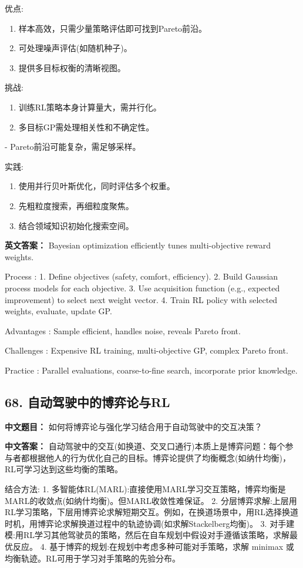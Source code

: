 \documentclass[10pt,a4paper]{ctexart}
\begin{document}
 优点:
\begin{enumerate}
    \item 样本高效，只需少量策略评估即可找到Pareto前沿。
    \item 可处理噪声评估(如随机种子)。
    \item 提供多目标权衡的清晰视图。
\end{enumerate}

 挑战:
\begin{enumerate}
    \item 训练RL策略本身计算量大，需并行化。
    \item 多目标GP需处理相关性和不确定性。
\end{enumerate}
- Pareto前沿可能复杂，需足够采样。

 实践:
\begin{enumerate}
    \item 使用并行贝叶斯优化，同时评估多个权重。
    \item 先粗粒度搜索，再细粒度聚焦。
    \item 结合领域知识初始化搜索空间。
\end{enumerate}

\textbf{英文答案：}  
Bayesian optimization efficiently tunes multi-objective reward weights.

 Process :
1. Define objectives (safety, comfort, efficiency).
2. Build Gaussian process models for each objective.
3. Use acquisition function (e.g., expected improvement) to select next weight vector.
4. Train RL policy with selected weights, evaluate, update GP.

 Advantages : Sample efficient, handles noise, reveals Pareto front.

 Challenges : Expensive RL training, multi-objective GP, complex Pareto front.

 Practice : Parallel evaluations, coarse-to-fine search, incorporate prior knowledge.

\subsection*{68. 自动驾驶中的博弈论与RL}
\textbf{中文题目：} 如何将博弈论与强化学习结合用于自动驾驶中的交互决策？

\textbf{中文答案：}  
自动驾驶中的交互(如换道、交叉口通行)本质上是博弈问题：每个参与者都根据他人的行为优化自己的目标。博弈论提供了均衡概念(如纳什均衡)，RL可学习达到这些均衡的策略。

 结合方法:
1.  多智能体RL(MARL):直接使用MARL学习交互策略，博弈均衡是MARL的收敛点(如纳什均衡)。但MARL收敛性难保证。
2.  分层博弈求解:上层用RL学习策略，下层用博弈论求解短期交互。例如，在换道场景中，用RL选择换道时机，用博弈论求解换道过程中的轨迹协调(如求解Stackelberg均衡)。
3.  对手建模:用RL学习其他驾驶员的策略，然后在自车规划中假设对手遵循该策略，求解最优反应。
4.  基于博弈的规划:在规划中考虑多种可能对手策略，求解 minimax 或均衡轨迹。RL可用于学习对手策略的先验分布。
\end{document}

